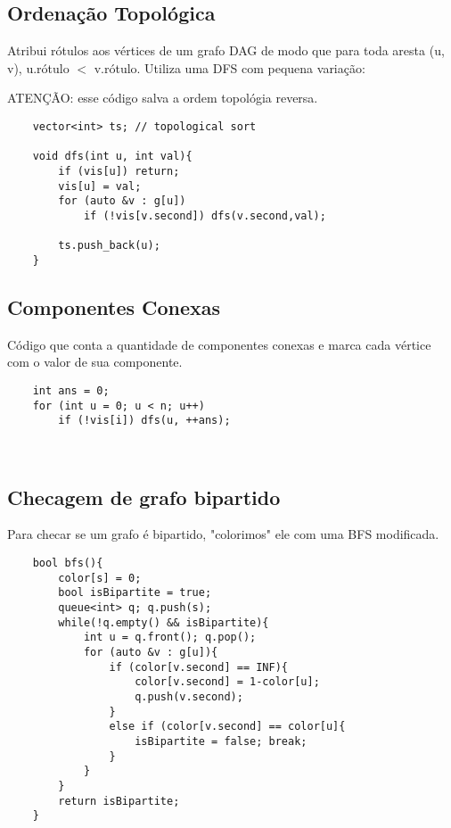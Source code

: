 \subsection{Ordenação Topológica} 
Atribui rótulos aos vértices de um grafo DAG de modo que para toda aresta (u, v), 
u.rótulo $<$ v.rótulo. Utiliza uma DFS com pequena variação:
\par ATENÇÃO: esse código salva a ordem topológia reversa.
\begin{verbatim}
    vector<int> ts; // topological sort
    
    void dfs(int u, int val){
        if (vis[u]) return;
        vis[u] = val;
        for (auto &v : g[u])
            if (!vis[v.second]) dfs(v.second,val);
        
        ts.push_back(u);   
    }
\end{verbatim}

\subsection{Componentes Conexas}
\par Código que conta a quantidade de componentes conexas e marca cada vértice com o valor de sua componente.
\begin{verbatim}
    int ans = 0;
    for (int u = 0; u < n; u++)
        if (!vis[i]) dfs(u, ++ans);
        
    
\end{verbatim}

\subsection{Checagem de grafo bipartido}
\par Para checar se um grafo é bipartido, "colorimos" ele com uma BFS modificada.
\begin{verbatim}
    bool bfs(){
        color[s] = 0;
        bool isBipartite = true;
        queue<int> q; q.push(s);
        while(!q.empty() && isBipartite){
            int u = q.front(); q.pop();
            for (auto &v : g[u]){
                if (color[v.second] == INF){
                    color[v.second] = 1-color[u];
                    q.push(v.second);
                }
                else if (color[v.second] == color[u]{
                    isBipartite = false; break;
                }
            }
        }
        return isBipartite;
    }
\end{verbatim}


